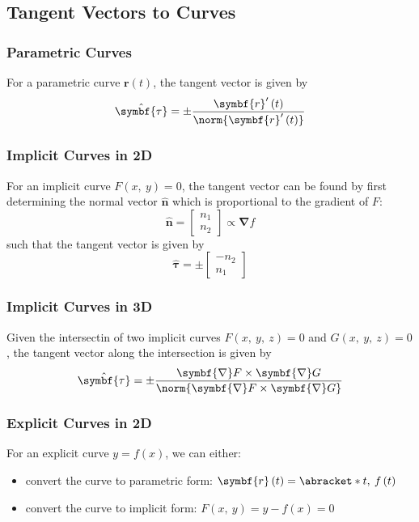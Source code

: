 \documentclass{article}
\begin{document}
\subsection{Tangent Vectors to Curves}
\subsubsection{Parametric Curves}
For a parametric curve \(\symbf{r}\left( t \right)\), the tangent
vector is given by
\begin{equation*}
    \hat{\symbf{\tau}} = \pm \frac{\symbf{r}'\left( t \right)}{\norm{\symbf{r}'\left( t \right)}}
\end{equation*}
\subsubsection{Implicit Curves in 2D}
For an implicit curve \(F\left( x,\: y \right) = 0\), the tangent
vector can be found by first determining the normal vector
\(\hat{\symbf{n}}\) which is proportional to the gradient of \(F\):
\begin{equation*}
    \hat{\symbf{n}} =
    \begin{bmatrix}
        n_1 \\
        n_2
    \end{bmatrix}
    \propto \symbf{\nabla} f
\end{equation*}
such that the tangent vector is given by
\begin{equation*}
    \hat{\symbf{\tau}} = \pm
    \begin{bmatrix}
        -n_2 \\
        n_1
    \end{bmatrix}
\end{equation*}
\subsubsection{Implicit Curves in 3D}
Given the intersectin of two implicit curves \(F\left( x,\: y,\: z
\right) = 0\) and \(G\left( x,\: y,\: z \right) = 0\), the tangent
vector along the intersection is given by
\begin{equation*}
    \hat{\symbf{\tau}} = \pm \frac{\symbf{\nabla} F \times \symbf{\nabla} G}{\norm{\symbf{\nabla} F \times \symbf{\nabla} G}}
\end{equation*}
\subsubsection{Explicit Curves in 2D}
For an explicit curve \(y = f\left( x \right)\), we can either:
\begin{itemize}
    \item convert the curve to parametric form: \(\symbf{r}\left( t
          \right) = \abracket*{t,\: f\left( t \right)}\)
    \item convert the curve to implicit form: \(F\left( x,\: y \right)
          = y - f\left( x \right) = 0\)
\end{itemize}
\end{document}
